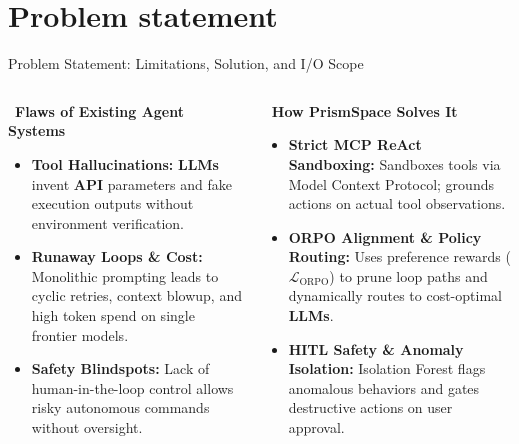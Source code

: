 
\section{Problem statement}

\begin{frame}{Problem Statement: Limitations, Solution, and I/O Scope}
\vspace{-0.35cm}
\begin{columns}[T]
    \begin{alertblock}{\small\faExclamationTriangle\ \textbf{Flaws of Existing Agent Systems}}
        \scriptsize
        \begin{itemize}\setlength{\itemsep}{0.12em}\leftskip=-1em
            \item \textbf{Tool Hallucinations:} \textbf{LLMs} invent \textbf{API} parameters and fake execution outputs without environment verification.
            \item \textbf{Runaway Loops \& Cost:} Monolithic prompting leads to cyclic retries, context blowup, and high token spend on single frontier models.
            \item \textbf{Safety Blindspots:} Lack of human-in-the-loop control allows risky autonomous commands without oversight.
        \end{itemize}
    \end{alertblock}

    \begin{exampleblock}{\small\faCheckCircle\ \textbf{How PrismSpace Solves It}}
        \scriptsize
        \begin{itemize}\setlength{\itemsep}{0.12em}\leftskip=-1em
            \item \textbf{Strict \textbf{MCP} \textbf{ReAct} Sandboxing:} Sandboxes tools via Model Context Protocol; grounds actions on actual tool observations.
            \item \textbf{ORPO Alignment \& Policy Routing:} Uses preference rewards ($\mathcal{L}_{\text{ORPO}}$) to prune loop paths and dynamically routes to cost-optimal \textbf{LLMs}.
            \item \textbf{HITL Safety \& Anomaly Isolation:} Isolation Forest flags anomalous behaviors and gates destructive actions on user approval.
        \end{itemize}
    \end{exampleblock}
\end{columns}


\end{frame}
